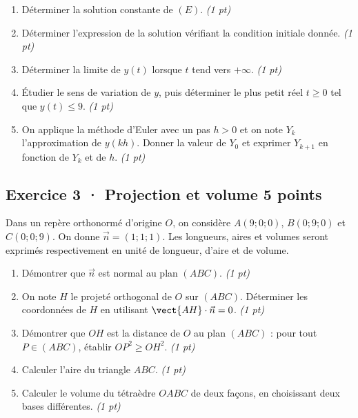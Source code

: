 \begin{enumerate}

\item Déterminer la solution constante de $(E)$. \hfill\textit{(1 pt)}

\item Déterminer l'expression de la solution vérifiant la condition initiale donnée. \hfill\textit{(1 pt)}

\item Déterminer la limite de $y(t)$ lorsque $t$ tend vers $+\infty$. \hfill\textit{(1 pt)}

\item Étudier le sens de variation de $y$, puis déterminer le plus petit réel $t\ge0$ tel que $y(t)\le9$. \hfill\textit{(1 pt)}

\item On applique la méthode d'Euler avec un pas $h>0$ et on note $Y_k$ l'approximation de $y(kh)$. Donner la valeur de $Y_0$ et exprimer $Y_{k+1}$ en fonction de $Y_k$ et de $h$. \hfill\textit{(1 pt)}

\end{enumerate}

\clearpage{}\par

\subsection*{Exercice 3 · Projection et volume \hfill 5 points}Dans un repère orthonormé d'origine $O$, on considère $A(9;0;0)$, $B(0;9;0)$ et $C(0;0;9)$. On donne $\vec n=(1;1;1)$. Les longueurs, aires et volumes seront exprimés respectivement en unité de longueur, d'aire et de volume.

\begin{enumerate}

\item Démontrer que $\vec n$ est normal au plan $(ABC)$. \hfill\textit{(1 pt)}

\item On note $H$ le projeté orthogonal de $O$ sur $(ABC)$. Déterminer les coordonnées de $H$ en utilisant $\vect{AH}\cdot\vec n=0$. \hfill\textit{(1 pt)}

\item Démontrer que $OH$ est la distance de $O$ au plan $(ABC)$ : pour tout $P\in(ABC)$, établir $OP^2\ge OH^2$. \hfill\textit{(1 pt)}

\item Calculer l'aire du triangle $ABC$. \hfill\textit{(1 pt)}

\item Calculer le volume du tétraèdre $OABC$ de deux façons, en choisissant deux bases différentes. \hfill\textit{(1 pt)}

\end{enumerate}

